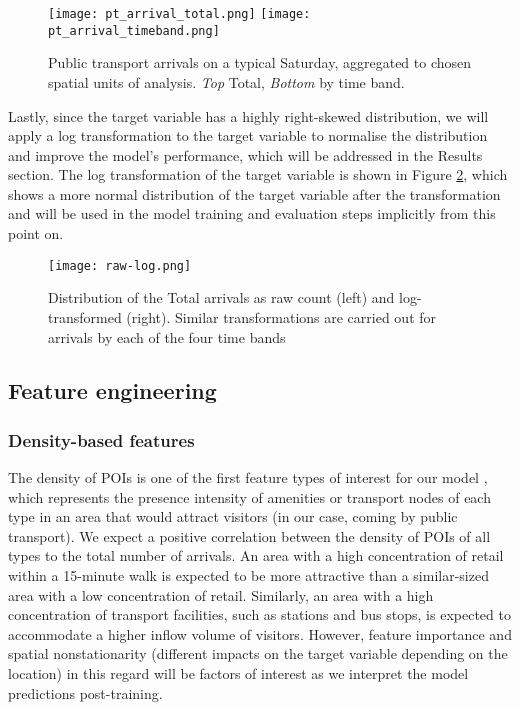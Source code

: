 \begin{figure}[!b]
    \centering
    \texttt{[image: pt\_arrival\_total.png]}
    \centering
    \texttt{[image: pt\_arrival\_timeband.png]}
    \captionsetup{justification=centering}
    \caption{Public transport arrivals on a typical Saturday, aggregated to chosen spatial units of analysis. \textit{Top} Total, \textit{Bottom} by time band.}
    \label{fig:ptarrival}
\end{figure}

Lastly, since the target variable has a highly right-skewed distribution, we will apply a log transformation to the target variable to normalise the distribution and improve the model's performance, which will be addressed in the Results section. The log transformation of the target variable is shown in Figure \ref{fig:rawlog}, which shows a more normal distribution of the target variable after the transformation and will be used in the model training and evaluation steps implicitly from this point on.

\begin{figure}[!ht]
    \centering
    \texttt{[image: raw-log.png]}
    \captionsetup{justification=centering}
    \caption{Distribution of the Total arrivals as raw count (left) and log-transformed (right). Similar transformations are carried out for arrivals by each of the four time bands}
    \label{fig:rawlog}
\end{figure}
\subsection{Feature engineering}
\subsubsection*{Density-based features}

The density of POIs is one of the first feature types of interest for our model \citep{cerveroTravelDemand3Ds1997}, which represents the presence intensity of amenities or transport nodes of each type in an area that would attract visitors (in our case, coming by public transport). We expect a positive correlation between the density of POIs of all types to the total number of arrivals. An area with a high concentration of retail within a 15-minute walk is expected to be more attractive than a similar-sized area with a low concentration of retail. Similarly, an area with a high concentration of transport facilities, such as stations and bus stops, is expected to accommodate a higher inflow volume of visitors. However, feature importance and spatial nonstationarity (different impacts on the target variable depending on the location) in this regard will be factors of interest as we interpret the model predictions post-training.


